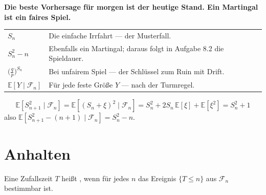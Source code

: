 \begin{merksatz}
\begin{center}
\begin{minipage}{0.9\textwidth}
\textbf{Die beste Vorhersage für morgen ist der heutige Stand. Ein Martingal ist ein faires Spiel.}
\end{minipage}
\end{center}

\begin{center}
{\small
\renewcommand{\arraystretch}{1.55}
\begin{tabular}{@{}P{2.8cm}P{5.8cm}@{}}
\toprule
$S_n$ & Die einfache Irrfahrt --- der Musterfall.\\
$S_n^{2} - n$ & Ebenfalls ein Martingal; daraus folgt in Aufgabe 8.2 die Spieldauer.\\
$\bigl(\tfrac{q}{p}\bigr)^{S_n}$ & Bei unfairem Spiel --- der Schlüssel zum Ruin mit Drift.\\
$\mathbb{E}[Y \mid \mathcal F_n]$ & Für jede feste Größe $Y$ --- nach der Turmregel.\\
\bottomrule
\end{tabular}}
\end{center}

\[ \mathbb{E}[S_{n+1}^{2} \mid \mathcal F_n] = \mathbb{E}[(S_n+\xi)^{2}\mid\mathcal F_n] = S_n^{2} + 2S_n\,\mathbb{E}[\xi] + \mathbb{E}[\xi^{2}] = S_n^{2}+1 \]
also $\mathbb{E}[S_{n+1}^{2}-(n+1)\mid\mathcal F_n] = S_n^{2}-n$. \checkmark

\begin{center}
\begin{minipage}{0.88\textwidth}
\end{minipage}
\end{center}
\end{merksatz}

\section{Anhalten}

\begin{definition}
Eine Zufallszeit $T$ heißt , wenn für jedes $n$ das Ereignis $\{T \le n\}$ aus $\mathcal F_n$ bestimmbar ist.
\end{definition}

